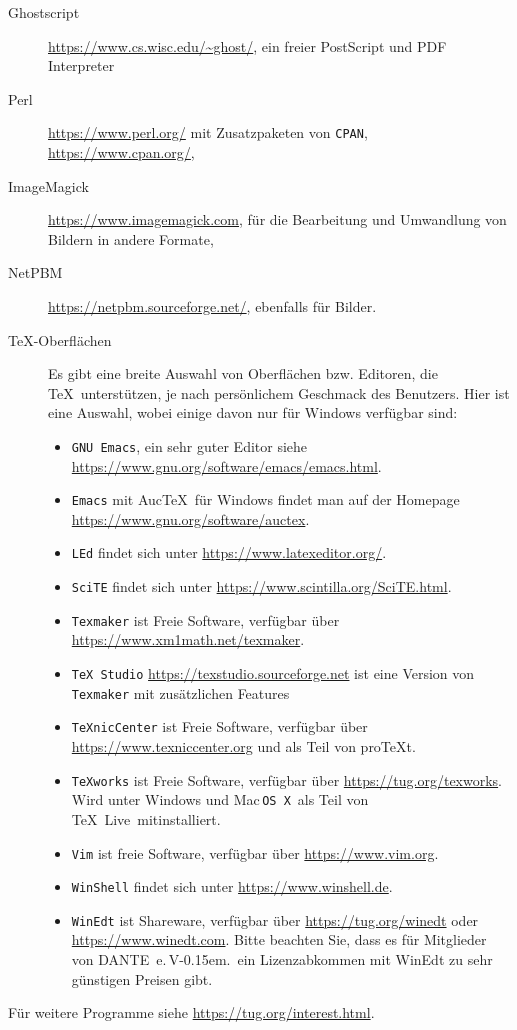 \documentclass[12pt,ngerman,a4paper,fullparskip]{scrreprt}
\newcommand{\TL}{\TeX\ Live\xspace}
\newcommand{\acro}[1]{\texttt{#1}}
\newcommand{\cmdname}[1]{\texttt{#1}}
\providecommand*{\MacOSX}{Mac\,\acro{OS\,X}\xspace}
\newcommand{\dante}{DANTE~e.\,V\kern-0.15em.}
\begin{document}
\begin{description}
\item[Ghostscript] \url{https://www.cs.wisc.edu/~ghost/}, ein freier PostScript und PDF Interpreter
\item[Perl] \url{https://www.perl.org/} mit Zusatzpaketen von
      \acro{CPAN}, \url{https://www.cpan.org/},
\item[ImageMagick] \url{https://www.imagemagick.com}, für die Bearbeitung
      und Umwandlung von Bildern in andere Formate,
\item[NetPBM] \url{https://netpbm.sourceforge.net/}, ebenfalls für Bilder.

\item[\TeX-Oberflächen] Es gibt eine breite Auswahl von Oberflächen bzw.
     Editoren, die \TeX\ unterstützen, je nach persönlichem Geschmack des
     Benutzers. Hier ist eine Auswahl, wobei einige davon nur für Windows verfügbar sind:
  \begin{itemize}
  \item \cmdname{GNU Emacs}, ein sehr guter Editor siehe
        \url{https://www.gnu.org/software/emacs/emacs.html}.
  \item \cmdname{Emacs} mit Auc\TeX\ für Windows findet man auf der Homepage  \url{https://www.gnu.org/software/auctex}.
  \item \cmdname{LEd} findet sich unter \url{https://www.latexeditor.org/}.
  \item \cmdname{SciTE} findet sich unter
        \url{https://www.scintilla.org/SciTE.html}.
  \item \cmdname{Texmaker} ist Freie Software, verfügbar über
        \url{https://www.xm1math.net/texmaker}.
  \item \cmdname{TeX Studio} \url{https://texstudio.sourceforge.net}
        ist eine Version von \cmdname{Texmaker} mit zusätzlichen Features
  \item \cmdname{TeXnicCenter} ist Freie Software, verfügbar über
        \url{https://www.texniccenter.org} und als Teil von pro\TeX{}t.
  \item \cmdname{TeXworks} ist Freie Software, verfügbar über
        \url{https://tug.org/texworks}. Wird unter Windows und
        \MacOSX\ als Teil von \TL\  mitinstalliert.
  \item \cmdname{Vim} ist freie Software, verfügbar über
        \url{https://www.vim.org}.
  \item \cmdname{WinShell} findet sich unter \url{https://www.winshell.de}.
  \item \cmdname{WinEdt} ist Shareware, verfügbar über
        \url{https://tug.org/winedt} oder \url{https://www.winedt.com}.
        Bitte beachten Sie, dass es für Mitglieder von \dante\ ein
        Lizenzabkommen mit WinEdt zu sehr günstigen Preisen gibt. 
  \end{itemize}
\end{description}
Für weitere Programme siehe \url{https://tug.org/interest.html}.
\end{document}
